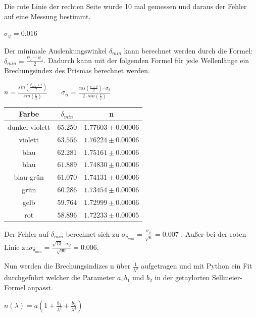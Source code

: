 \documentclass[a4paper, 11pt]{article}
\begin{document}
Die rote Linie der rechten Seite wurde 10 mal gemessen und daraus der Fehler auf eine Messung bestimmt.
\begin{center}
$\sigma_{\psi}=0.016$
\end{center}
Der minimale Auslenkungswinkel $\delta_{min}$ kann berechnet werden durch die Formel: $\delta_{min}=\frac{\psi_2-\psi_1}{2}$.
Dadurch kann mit der folgenden Formel für jede Wellenlänge ein Brechungsindex des Prismas berechnet werden.
\begin{center}
$n=\frac{sin(\frac{\delta_{min}+\epsilon}{2})}{sin(\frac{\epsilon}{2})}\;\;\;\;\;\;\; \sigma_n=\frac{cos(\frac{\epsilon+\delta}{2})\cdot \sigma_{\delta}}{2\cdot sin(\frac{\epsilon}{2})}$
\end{center}

\begin{center}
\begin{tabular}{|c|c|c|}
\hline Farbe & $\delta_{min}$ & n\\
\hline dunkel-violett &$65.250$&$1.77603 \pm 0.00006$\\
\hline violett &$63.556$&$1.76224 \pm0.00006 $\\
\hline blau  &$62.281$&$1.75161 \pm0.00006 $\\
\hline blau&$61.889$&$1.74830 \pm0.00006 $\\
\hline blau-grün  &$61.070$&$ 1.74131\pm0.00006 $\\
\hline grün &$60.286$&$1.73454 \pm0.00006 $\\
\hline gelb &$ 59.764$&$1.72999 \pm0.00006 $\\
\hline rot &$58.896$&$1.72233 \pm 0.00005$\\
\hline 
\end{tabular}
\end{center}
Der Fehler auf $\delta_{min}$ berechnet sich zu $\sigma_{\delta_{min}}=\frac{\sigma_{\psi}}{\sqrt{6}}=0.007$ . Außer bei der roten Linie zu$\sigma_{\delta_{min}}=\frac{\sqrt{13}\cdot \sigma_{\psi}}{\sqrt{90}}=0.006$.

Nun werden die Brechungsindizes n über $\frac{1}{\lambda^2}$ aufgetragen und mit Python ein Fit durchgeführt welcher die Parameter $a,b_1$ und $b_2$ in der getaylorten Sellmeier-Formel anpasst.
\begin{center}
$n(\lambda )=a(1+\frac{b_1}{\lambda^2}+\frac{b_2}{\lambda^4 })$
\end{center}
\end{document}
